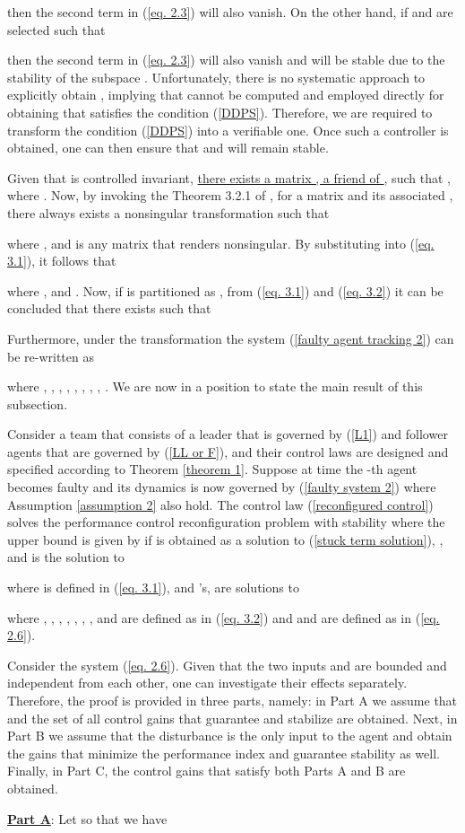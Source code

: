 \documentclass[12pt,draftcls,onecolumn]{IEEEtran}
\begin{document}
 then  the second term in (\ref{eq. 2.3}) will also vanish. On the other hand, if  and  are selected such that 
  
 then the second term in (\ref{eq. 2.3})  will also vanish and  will be stable due to the stability of the subspace .
Unfortunately, there is no systematic approach to explicitly obtain , implying that  cannot be computed and employed directly for obtaining  that satisfies the condition (\ref{DDPS}). Therefore, we are required to transform the  condition (\ref{DDPS}) into a verifiable one. Once such a controller is obtained, one can then ensure that  and  will remain stable. \par
Given that  is  controlled invariant, \underline{there exists a matrix , a friend of }, \cite{Basile92} such that , where . Now, by invoking the Theorem 3.2.1 of \cite{Basile92}, for a matrix  and its associated , there always exists a nonsingular transformation  such that 

where ,  and  is any matrix that renders  nonsingular.
By substituting  into (\ref{eq. 3.1}), it follows that 

where ,  and . Now, if  is  partitioned  as , from  (\ref{eq. 3.1}) and (\ref{eq. 3.2}) it can be concluded that there exists  such that 
\par
Furthermore, under the transformation  the system (\ref{faulty agent tracking 2}) can be re-written as

where , , , , , , , , . We are now in a position to state the main result of this subsection.  
\begin{theorems}\label{theorem 2}
Consider a team that consists of  a leader that is governed by (\ref{L1}) and  follower agents that are governed by (\ref{LL or F}), and their control laws are designed and specified according to Theorem \ref{theorem 1}. Suppose at time  the -th agent becomes faulty and its dynamics is now governed by (\ref{faulty system 2}) where Assumption \ref{assumption 2} also hold. The control law (\ref{reconfigured control}) solves the  performance  control reconfiguration problem with stability  where the   upper bound is given by   if  is obtained as a solution to (\ref{stuck term solution}),  , and  is the solution to 

 where  is  defined in  (\ref{eq. 3.1}),   and 's,  are solutions to 

where 
, , , , , , ,  and  are defined as in (\ref{eq. 3.2}) and  and  are  defined as in (\ref{eq. 2.6}).
 \end{theorems}
 \proof 
Consider the system (\ref{eq. 2.6}). Given that the two inputs  and   are bounded and independent from each other, one can investigate their effects separately. Therefore, the proof is provided in three parts, namely: in Part A we assume that  and the set of all control gains that guarantee  and stabilize  are obtained. Next, in Part B we assume that the disturbance is the only input to the agent and obtain the gains that minimize the  performance index and guarantee stability as well.  Finally, in Part C, the control gains that satisfy both Parts A and B are obtained.\par
\underline{\textbf{Part A}}: Let   so that we have
\end{document}
